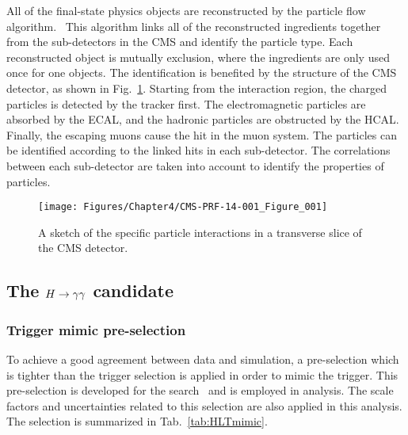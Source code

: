 All of the final-state physics objects are reconstructed by the particle flow algorithm.~\cite{1706.04965}
This algorithm links all of the reconstructed ingredients together from the sub-detectors in the CMS and identify the particle type.
Each reconstructed object is mutually exclusion, where the ingredients are only used once for one objects.
The identification is benefited by the structure of the CMS detector, as shown in Fig.~\ref{fig:CMSPFsket}.
Starting from the interaction region, the charged particles is detected by the tracker first.
The electromagnetic particles are absorbed by the ECAL, and the hadronic particles are obstructed by the HCAL.
Finally, the escaping muons cause the hit in the muon system.
The particles can be identified according to the linked hits in each sub-detector.
The correlations between each sub-detector are taken into account to identify the properties of particles.


\begin{figure}[h]
  \centering
  \texttt{[image: Figures/Chapter4/CMS-PRF-14-001\_Figure\_001]}
  \caption{A sketch of the specific particle interactions in a transverse slice of the CMS detector.~\cite{1706.04965}}
  \label{fig:CMSPFsket}
\end{figure}

\subsection{The $H\to\gamma\gamma$ candidate}

\subsubsection{Trigger mimic pre-selection}

To achieve a good agreement between data and simulation, a pre-selection which is tighter than the trigger selection is applied in order to mimic the trigger.
This pre-selection is developed for the \Hgg search~\cite{1804.02716} and is employed in \HHbbgg analysis.
The scale factors and uncertainties related to this selection are also applied in this analysis.
The selection is summarized in Tab.~\ref{tab:HLTmimic}.

